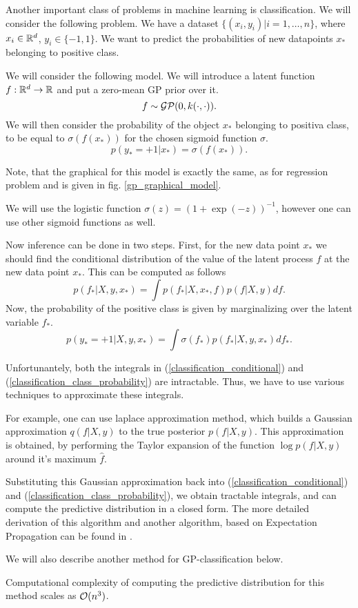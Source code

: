 \label{gp-classification}
Another important class of problems in machine learning is classification. We will consider the following problem. We have a dataset $\{(x_i, y_i) | i = 1, \ldots, n\}$, where $x_i \in \mathbb{R}^d$, $y_i \in \{-1, 1\}$. We want to predict the probabilities of new datapoints $x_*$ belonging to positive class.

We will consider the following model. We will introduce a latent function $f: \mathbb{R}^d \rightarrow \mathbb{R}$ and put a zero-mean GP prior over it. 
$$f \sim \mathcal{GP}(0, k(\cdot, \cdot)).$$
We will then consider the probability of the object $x_*$ belonging to positiva class, to be equal to $\sigma(f(x_*))$ for the chosen sigmoid function $\sigma$.
$$p(y_* = +1 | x_*) = \sigma(f(x_*)).$$

Note, that the graphical for this model is exactly the same, as for regression problem and is given in fig. \ref{gp_graphical_model}.

We will use the logistic function $\sigma(z) = (1 + \exp(-z))^{-1}$, however one can use other sigmoid functions as well.

Now inference can be done in two steps. First, for the new data point $x_*$ we should find the conditional distribution of the value of the latent process $f$ at the new data point $x_*$. This can be computed as follows
\begin{equation}
	\label{classification_conditional}
	p(f_* | X, y, x_*) = \int p(f_* | X, x_*, f) p(f | X, y) df.
\end{equation}
Now, the probability of the positive class is given by marginalizing over the latent variable $f_*$.
\begin{equation}
	\label{classification_class_probability}
	p(y_* = +1 | X, y, x_*) = \int \sigma(f_*) p(f_* | X, y, x_*) df_*.
\end{equation}

Unfortunantely, both the integrals in (\ref{classification_conditional}) and (\ref{classification_class_probability}) are intractable. Thus, we have to use various techniques to approximate these integrals. 

For example, one can use laplace approximation method, which builds a Gaussian approximation $q(f | X, y)$ to the true posterior $p(f | X, y)$. This approximation is obtained, by performing the Taylor expansion of the function $\log p(f | X, y)$ around it's maximum $\hat f$. 

Substituting this Gaussian approximation back into (\ref{classification_conditional}) and (\ref{classification_class_probability}), we obtain tractable integrals, and can compute the predictive distribution in a closed form. The more detailed derivation of this algorithm and another algorithm, based on Expectation Propagation can be found in \cite{GPinML}.

We will also describe another method for GP-classification below.

Computational complexity of computing the predictive distribution for this method scales as $\mathcal{O}(n^3)$.